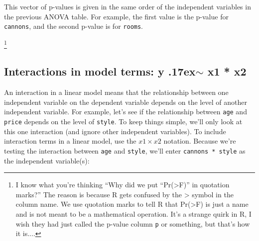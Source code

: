 \documentclass{tufte-book}\usepackage[]{graphicx}\usepackage[]{color}
\makeatletter
\newcommand{\hlstr}[1]{\textcolor[rgb]{0.192,0.494,0.8}{#1}}%
\newcommand{\hlopt}[1]{\textcolor[rgb]{0,0,0}{#1}}%
\newcommand{\hlstd}[1]{\textcolor[rgb]{0.345,0.345,0.345}{#1}}%
\newcommand{\hlkwd}[1]{\textcolor[rgb]{0.737,0.353,0.396}{\textbf{#1}}}%
\newenvironment{kframe}{%
 \def\at@end@of@kframe{}%
 \ifinner\ifhmode%
  \def\at@end@of@kframe{\end{minipage}}%
  \begin{minipage}{\columnwidth}%
 \fi\fi%
 \def\FrameCommand##1{\hskip\@totalleftmargin \hskip-\fboxsep
 \colorbox{shadecolor}{##1}\hskip-\fboxsep
     \hskip-\linewidth \hskip-\@totalleftmargin \hskip\columnwidth}%
 \MakeFramed {\advance\hsize-\width
   \@totalleftmargin\z@ \linewidth\hsize
   \@setminipage}}%
 {\par\unskip\endMakeFramed%
 \at@end@of@kframe}
\newenvironment{knitrout}{}{} %
\makeatother
\begin{document}

This vector of p-values is given in the same order of the independent variables in the previous ANOVA table. For example, the first value is the p-value for \texttt{cannons}, and the second p-value is for \texttt{rooms}.


\footnote{I know what you're thinking ``Why did we put ``Pr(>F)'' in quotation marks?'' The reason is because R gets confused by the > symbol in the column name. We use quotation marks to tell R that Pr(>F) is just a name and is not meant to be a mathematical operation. It's a strange quirk in R, I wish they had just called the p-value column \texttt{p} or something, but that's how it is....}


\subsection{Interactions in model terms: y {\raise.17ex\hbox{$\scriptstyle\sim$}} x1 * x2}

An interaction in a linear model means that the relationship between one independent variable on the dependent variable depends on the level of another independent variable. For example, let's see if the relationship between \texttt{age} and \texttt{price} depends on the level of \texttt{style}. To keep things simple, we'll only look at this one interaction (and ignore other independent variables). To include interaction terms in a linear model, use the $x1 \times x2$ notation. Because we're testing the interaction between \texttt{age} and \texttt{style}, we'll enter \texttt{cannons * style} as the independent variable(s):
\end{document}

